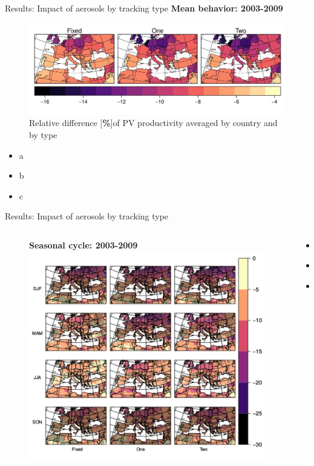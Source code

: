 \documentclass{beamer}%
\begin{document}
\begin{frame}[fragile]{Results: Impact of aerosols by tracking type}
\textbf{Mean behavior: 2003-2009}
  \begin{figure}
  \includegraphics[scale=0.3]{byCountry}  
\caption{Relative difference [\textbf{\%}]of PV productivity averaged by country and by type}
\end{figure}
\begin{itemize}
\item a
\item b
\item c  
\end{itemize}
\end{frame}

\begin{frame}[fragile]{Results: Impact of aerosols by tracking type}
  \begin{columns}
  \begin{column}{0.7\textwidth}
    \begin{figure}
\small{\textbf{Seasonal cycle: 2003-2009}}
  \includegraphics[scale=0.5]{seasonalimpact.pdf}  
\end{figure}
\end{column}
\begin{column}{0.43\textwidth}
\begin{itemize}
\item a
\item b
\item c  
\end{itemize}
\end{column}
 \end{columns}
\end{frame}
\end{document}
